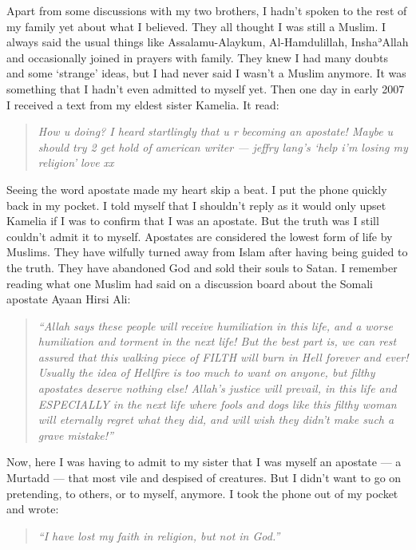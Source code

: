 \documentclass[12pt]{memoir}
\def\´{ʾ} %
\begin{document}
Apart from some discussions with my two brothers,
I hadn’t spoken to the rest of my family yet about what I believed.
They all thought I was still a Muslim.
I always said the usual things like Assalamu-Alaykum, Al-Hamdulillah,
Insha\´Allah and occasionally joined in prayers with family.
They knew I had many doubts and some ‘strange’ ideas,
but I had never said I wasn’t a Muslim anymore.
It was something that I hadn’t even admitted to myself yet.
Then one day in early 2007 I received a text from my eldest sister Kamelia.
It read:

\begin{quote}
\itshape
How u doing?
I heard startlingly that u r becoming an apostate!
Maybe u should try 2 get hold of american writer —
jeffry lang’s ‘help i’m losing my religion’ love xx
\end{quote}

Seeing the word apostate made my heart skip a beat.
I put the phone quickly back in my pocket.
I told myself that I shouldn’t reply as it would only upset Kamelia
if I was to confirm that I was an apostate.
But the truth was I still couldn’t admit it to myself.
Apostates are considered the lowest form of life by Muslims.
They have wilfully turned away from Islam
after having being guided to the truth.
They have abandoned God and sold their souls to Satan.
I remember reading what one Muslim had said on a discussion board
about the Somali apostate Ayaan Hirsi Ali:

\begin{quote}
\itshape
“Allah says these people will receive humiliation in this life,
and a worse humiliation and torment in the next life!
But the best part is, we can rest assured
that this walking piece of FILTH will burn in Hell forever and ever!
Usually the idea of Hellfire is too much to want on anyone,
but filthy apostates deserve nothing else! Allah’s justice will prevail,
in this life and ESPECIALLY in the next life where fools and dogs
like this filthy woman will eternally regret what they did,
and will wish they didn’t make such a grave mistake!”
\end{quote}

Now, here I was having to admit to my sister that I was myself an apostate —
a Murtadd — that most vile and despised of creatures.
But I didn’t want to go on pretending, to others, or to myself, anymore.
I took the phone out of my pocket and wrote:

\begin{quote}
\emph{“I have lost my faith in religion, but not in God.”}
\end{quote}
\end{document}
